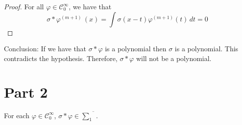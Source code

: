 \documentclass[../main.tex]{subfiles}
\begin{document}
	\begin{proof} For all $\varphi \in \mathcal{C}^\infty_0$, we have that
	$$\sigma \ast \varphi^{(m+1)} \, (x)=\int \sigma(x-t)\varphi^{(m+1)}(t) \, dt= 0$$  
	\end{proof} 
\noindent Conclusion: If we have that $\sigma \ast \varphi$ is a polynomial then $\sigma$ is a polynomial. This contradicts the hypothesis. Therefore, $\sigma \ast \varphi$ will not be a polynomial. 

\section{Part 2}

	\begin{lema} %
		For each $\varphi \in  \mathcal{C}^\infty_0$, $ \sigma \ast \varphi \in  \overline{\sum_1}$. 
		
	\end{lema}
	
\end{document}
